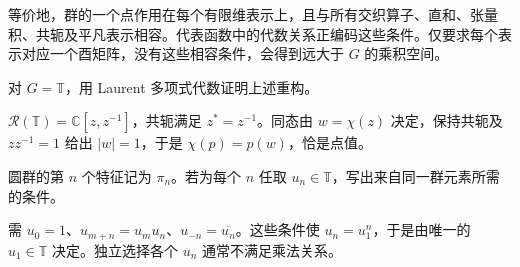 等价地，群的一个点作用在每个有限维表示上，且与所有交织算子、直和、张量积、共轭及平凡表示相容。代表函数中的代数关系正编码这些条件。仅要求每个表示对应一个酉矩阵，没有这些相容条件，会得到远大于 $G$ 的乘积空间。

\begin{exercise}[圆群的重构]\label{ex:y11-tannaka-circle}
对 $G=\mathbb T$，用 Laurent 多项式代数证明上述重构。
\end{exercise}
\begin{solution}
$\mathcal R(\mathbb T)=\mathbb C[z,z^{-1}]$，共轭满足 $z^*=z^{-1}$。同态由 $w=\chi(z)$ 决定，保持共轭及 $zz^{-1}=1$ 给出 $|w|=1$，于是 $\chi(p)=p(w)$，恰是点值。
\end{solution}

\begin{exercise}[张量相容性]\label{ex:y11-tannaka-tensor}
圆群的第 $n$ 个特征记为 $\pi_n$。若为每个 $n$ 任取 $u_n\in\mathbb T$，写出来自同一群元素所需的条件。
\end{exercise}
\begin{solution}
需 $u_0=1$、$u_{m+n}=u_mu_n$、$u_{-n}=\overline{u_n}$。这些条件使 $u_n=u_1^n$，于是由唯一的 $u_1\in\mathbb T$ 决定。独立选择各个 $u_n$ 通常不满足乘法关系。
\end{solution}
